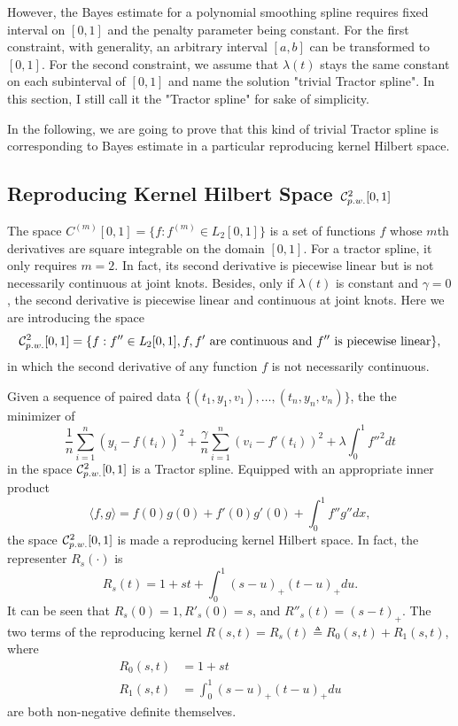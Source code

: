 However, the Bayes estimate for a polynomial smoothing spline requires fixed interval on $[0,1]$ and the penalty parameter being constant. For the first constraint, with generality, an arbitrary interval $[a,b]$ can be transformed to $[0,1]$. For the second constraint, we assume that $\lambda(t)$ stays the same constant on each subinterval of $[0,1]$ and name the solution "trivial Tractor spline".  In this section, I still call it the "Tractor spline" for sake of simplicity. 


In the following, we are going to prove that this kind of trivial Tractor spline is corresponding to Bayes estimate in a particular reproducing kernel Hilbert space. 


\subsection{Reproducing Kernel Hilbert Space $\mathcal{C}_{\footnotesize p.w.}^{2}[0,1]$}

The space $C^{(m)}[0,1]=\{ f:f^{(m)}\in \mathit{L}_2[0,1] \}$ is a set of functions $f$ whose $m$th derivatives are square integrable on the domain $[0,1]$. For a tractor spline, it only requires $m=2$. In fact, its second derivative is piecewise linear but is not necessarily continuous at joint knots. Besides, only if $\lambda(t)$ is constant and $\gamma=0$, the second derivative is piecewise linear and continuous at joint knots. Here we are introducing the space 
\begin{equation*}
\mathcal{C}_{\footnotesize p.w.}^{2}[0,1]=\{f: f''\in \mathit{L}_2[0,1], f,f' \mbox{ are continuous and } f'' \mbox{ is piecewise linear}\},
\end{equation*}
in which the second derivative of any function $f$ is not necessarily continuous. 


Given a sequence of paired data $\{(t_1,y_1,v_1),\ldots, (t_n,y_n,v_n) \}$, the the minimizer of 
\begin{equation}\label{maineq}
\frac{1}{n}\sum_{i=1}^{n}(y_i-f(t_i))^2+\frac{\gamma}{n}\sum_{i=1}^{n}(v_i-f'(t_i))^2+\lambda \int_{0}^{1}f''^2dt
\end{equation}
in the space $\mathcal{C}_{\footnotesize p.w.}^{2}[0,1]$ is a Tractor spline. Equipped with an appropriate inner product
\begin{equation}\label{TractorSplineInnerProduct}
\langle f,g \rangle=f(0) g(0)+f'(0) g'(0)+\int_{0}^{1}f''g''dx,
\end{equation}
the space $\mathcal{C}_{\footnotesize p.w.}^{2}[0,1]$ is made a reproducing kernel Hilbert space. In fact, the representer $R_s(\cdot)$ is 
\begin{equation}\label{kerneleq}
R_s(t)=1+st+\int_{0}^{1} (s-u)_+(t-u)_+du.
\end{equation}
It can be seen that $R_s(0)=1, R'_s(0)=s$, and $R''_s(t)=(s-t)_+$. The two terms of the reproducing kernel $R(s,t)=R_s(t)\triangleq R_0(s,t)+R_1(s,t)$, where
\begin{align*} %
R_0(s,t)&=1+st \\ %
R_1(s,t)&=\int_{0}^{1} (s-u)_+(t-u)_+du
\end{align*}
are both non-negative definite themselves.


